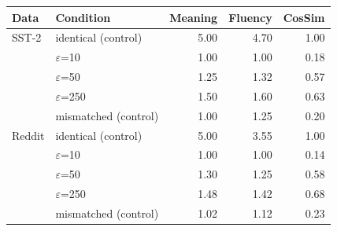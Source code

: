 \begin{tabular}{llrrr}
\toprule
Data & Condition & Meaning & Fluency & CosSim \\
\midrule
SST-2 & identical (control) & 5.00 & 4.70 & 1.00 \\
 & $\varepsilon$=10 & 1.00 & 1.00 & 0.18 \\
 & $\varepsilon$=50 & 1.25 & 1.32 & 0.57 \\
 & $\varepsilon$=250 & 1.50 & 1.60 & 0.63 \\
 & mismatched (control) & 1.00 & 1.25 & 0.20 \\
\midrule
Reddit & identical (control) & 5.00 & 3.55 & 1.00 \\
 & $\varepsilon$=10 & 1.00 & 1.00 & 0.14 \\
 & $\varepsilon$=50 & 1.30 & 1.25 & 0.58 \\
 & $\varepsilon$=250 & 1.48 & 1.42 & 0.68 \\
 & mismatched (control) & 1.02 & 1.12 & 0.23 \\
\bottomrule
\end{tabular}
